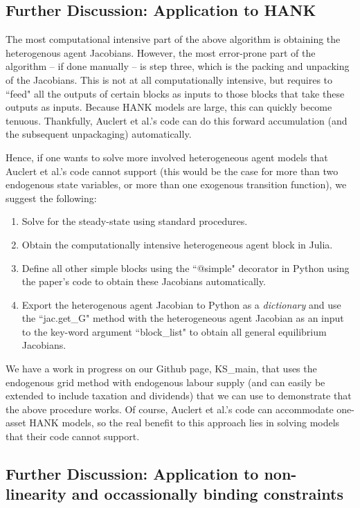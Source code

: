 \documentclass[10pt]{article} %
\begin{document}
\subsection*{Further Discussion: Application to HANK}

The most computational intensive part of the above algorithm is obtaining the heterogenous agent Jacobians. However, the most error-prone part of the algorithm -- if done manually -- is step three, which is the packing and unpacking of the Jacobians. This is not at all computationally intensive, but requires to ``feed" all the outputs of certain blocks as inputs to those blocks that take these outputs as inputs. Because HANK models are large, this can quickly become tenuous. Thankfully, Auclert et al.'s code can do this forward accumulation (and the subsequent unpackaging) automatically.

Hence, if one wants to solve more involved heterogeneous agent models that Auclert et al.'s code cannot support (this would be the case for more than two endogenous state variables, or more than one exogenous transition function), we suggest the following:

\begin{enumerate}
\item Solve for the steady-state using standard procedures.
\item Obtain the computationally intensive heterogeneous agent block in Julia.
\item Define all other simple blocks using the ``@simple" decorator in Python using the paper's code to obtain these Jacobians automatically.
\item Export the heterogenous agent Jacobian to Python as a \emph{dictionary} and use the ``jac.get\_G" method with the heterogeneous agent Jacobian as an input to the key-word argument ``block\_list" to obtain all general equilibrium Jacobians.
\end{enumerate}

We have a work in progress on our Github page, KS\_main, that uses the endogenous grid method with endogenous labour supply (and can easily be extended to include taxation and dividends) that we can use to demonstrate that the above procedure works. Of course, Auclert et al.'s code can accommodate one-asset HANK models, so the real benefit to this approach lies in solving models that their code cannot support.

\subsection*{Further Discussion: Application to non-linearity and occassionally binding constraints}
\end{document}
